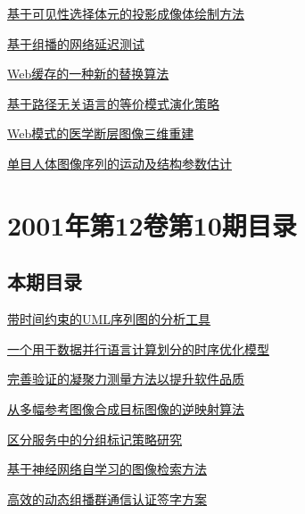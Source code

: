 \documentclass[a4paper]{article}
\begin{document}
\href{http://www.jos.org.cn/ch/reader/download_pdf.aspx?file_no=20011118&year_id=2001&quarter_id=11&falg=1}{基于可见性选择体元的投影成像体绘制方法}

\href{http://www.jos.org.cn/ch/reader/download_pdf.aspx?file_no=20011119&year_id=2001&quarter_id=11&falg=1}{基于组播的网络延迟测试}

\href{http://www.jos.org.cn/ch/reader/download_pdf.aspx?file_no=20011120&year_id=2001&quarter_id=11&falg=1}{Web缓存的一种新的替换算法}

\href{http://www.jos.org.cn/ch/reader/download_pdf.aspx?file_no=20011121&year_id=2001&quarter_id=11&falg=1}{基于路径无关语言的等价模式演化策略}

\href{http://www.jos.org.cn/ch/reader/download_pdf.aspx?file_no=20011122&year_id=2001&quarter_id=11&falg=1}{Web模式的医学断层图像三维重建}

\href{http://www.jos.org.cn/ch/reader/download_pdf.aspx?file_no=20011123&year_id=2001&quarter_id=11&falg=1}{单目人体图像序列的运动及结构参数估计}


\section{\textbf{2001年第12卷第10期目录}}
\subsection{本期目录}
\href{http://www.jos.org.cn/ch/reader/download_pdf.aspx?file_no=20011001&year_id=2001&quarter_id=10&falg=1}{带时间约束的UML序列图的分析工具}

\href{http://www.jos.org.cn/ch/reader/download_pdf.aspx?file_no=20011002&year_id=2001&quarter_id=10&falg=1}{一个用于数据并行语言计算划分的时序优化模型}

\href{http://www.jos.org.cn/ch/reader/download_pdf.aspx?file_no=20011003&year_id=2001&quarter_id=10&falg=1}{完善验证的凝聚力测量方法以提升软件品质}

\href{http://www.jos.org.cn/ch/reader/download_pdf.aspx?file_no=20011004&year_id=2001&quarter_id=10&falg=1}{从多幅参考图像合成目标图像的逆映射算法}

\href{http://www.jos.org.cn/ch/reader/download_pdf.aspx?file_no=20011005&year_id=2001&quarter_id=10&falg=1}{区分服务中的分组标记策略研究}

\href{http://www.jos.org.cn/ch/reader/download_pdf.aspx?file_no=20011006&year_id=2001&quarter_id=10&falg=1}{基于神经网络自学习的图像检索方法}

\href{http://www.jos.org.cn/ch/reader/download_pdf.aspx?file_no=20011007&year_id=2001&quarter_id=10&falg=1}{高效的动态组播群通信认证签字方案}
\end{document}
